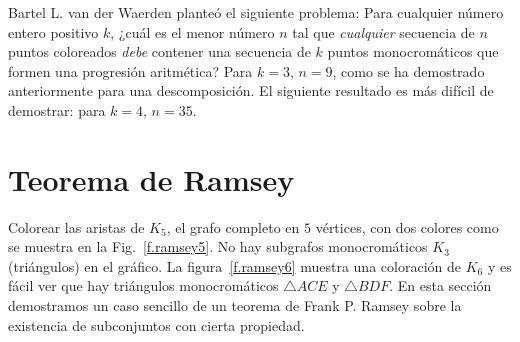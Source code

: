 Bartel L. van der Waerden planteó el siguiente problema: Para cualquier número entero positivo $k$, ¿cuál es el menor número $n$ tal que \emph{cualquier} secuencia de $n$ puntos coloreados \emph{debe} contener una secuencia de $k$ puntos monocromáticos que formen una progresión aritmética? Para $k=3$, $n=9$, como se ha demostrado anteriormente para una descomposición. El siguiente resultado es más difícil de demostrar: para $k=4$, $n=35$.


\section{Teorema de Ramsey}\label{s.ramsey}

Colorear las aristas de $K_5$, el grafo completo en $5$ vértices, con dos colores como se muestra en la Fig.~\ref{f.ramsey5}. No hay subgrafos monocromáticos $K_3$ (triángulos) en el gráfico. La figura~\ref{f.ramsey6} muestra una coloración de $K_6$ y es fácil ver que hay triángulos monocromáticos $\triangle ACE$ y $\triangle BDF$. En esta sección demostramos un caso sencillo de un teorema de Frank P. Ramsey sobre la existencia de subconjuntos con cierta propiedad.
